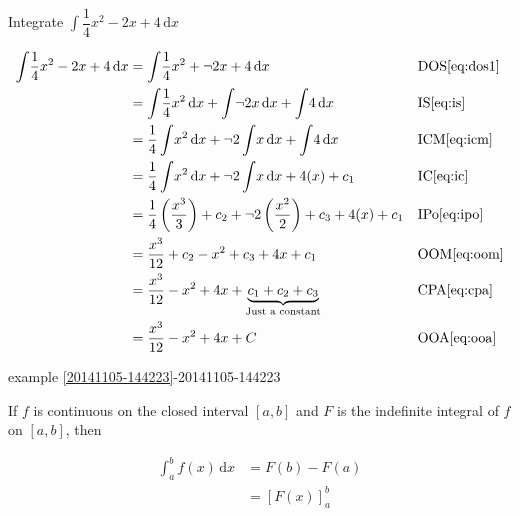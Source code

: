 \begin{example}[id:20141105-172103] \label{20141105-172103}  \hfill \\
	
Integrate $\displaystyle \int \! \dfrac{1}{4}x^2-2x+4 \, \mathrm{d} x$ 

\soln

\solnsteps
\begin{align*}
\displaystyle \int \! \dfrac{1}{4}x^2-2x+4 \, \mathrm{d} x &= \displaystyle \int \! \dfrac{1}{4}x^2 + \neg 2x+4 \, \mathrm{d} x && \text{DOS} \eqref{eq:dos1} \\
&= \displaystyle \int \! \dfrac{1}{4}x^2 \, \mathrm{d} x + \displaystyle \int \! \neg 2x \, \mathrm{d} x + \displaystyle \int \! 4 \, \mathrm{d} x && \text{IS} \eqref{eq:is} \\
&= \dfrac{1}{4}\displaystyle \int \! x^2 \, \mathrm{d} x + \neg 2\displaystyle \int \! x \, \mathrm{d} x + \displaystyle \int \! 4 \, \mathrm{d} x && \text{ICM} \eqref{eq:icm} \\
&= \dfrac{1}{4}\displaystyle \int \! x^2 \, \mathrm{d} x + \neg 2\displaystyle \int \! x \, \mathrm{d} x + 4(x) + c_1 && \text{IC} \eqref{eq:ic} \\
&= \dfrac{1}{4} \left( \dfrac{x^3}{3} \right) + c_2 + \neg 2 \left(\dfrac{x^2}{2} \right) + c_3 + 4(x) + c_1 && \text{IPo} \eqref{eq:ipo} \\
&= \dfrac{x^3}{12} + c_2 - x^2 + c_3 + 4x + c_1 && \text{OOM} \eqref{eq:oom} \\
&= \dfrac{x^3}{12} - x^2 + 4x + \underbrace{c_1 + c_2 + c_3}_{\text{Just a constant}} && \text{CPA} \eqref{eq:cpa} \\
&= \dfrac{x^3}{12} - x^2 + 4x + C && \text{OOA} \eqref{eq:ooa} 
\end{align*}

\qdepend

\qdependlist

example \ref{20141105-144223}-20141105-144223


\end{example}

\begin{theorem}
If $f$ is continuous on the closed interval $[a, b]$ and $F$ is the indefinite integral of $f$ on $[a, b]$, then

\begin{subequations}
\begin{align}
\displaystyle \int_{a}^{b} \! f(x) \, \mathrm{d} x 	&= F(b)-F(a) \label{eq:fthmc}\\
													&= \left[F(x)\right]_{a}^b 
\end{align}
\end{subequations}
\end{theorem}

